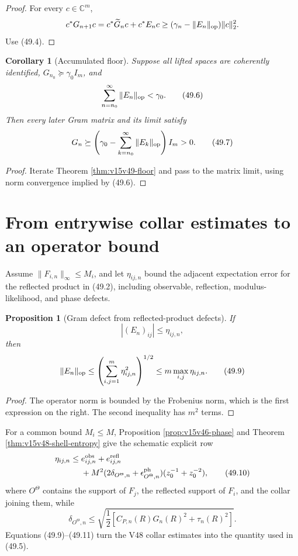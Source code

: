 \documentclass[11pt]{article}
\newtheorem{proposition}[theorem]{Proposition}
\newtheorem{corollary}[theorem]{Corollary}
\theoremstyle{remark}
\begin{document}
\begin{proof}
For every \(c\in\mathbb C^m\),
\[
 c^*G_{n+1}c
 =c^*\widetilde G_nc+c^*E_nc
 \geq(\gamma_n-\|E_n\|_{\rm op})\|c\|_2^2.
\]
Use (49.4).
\end{proof}

\begin{corollary}[Accumulated floor]
\label{cor:v15v49-accumulated}
Suppose all lifted spaces are coherently identified,
\(G_{n_0}\succeq\gamma_0I_m\), and
\[
 \sum_{n=n_0}^\infty\|E_n\|_{\rm op}<\gamma_0.           \tag{49.6}
\]
Then every later Gram matrix and its limit satisfy
\[
 G_n\succeq
 \left(\gamma_0-\sum_{k=n_0}^\infty\|E_k\|_{\rm op}\right)I_m
 >0.                                                     \tag{49.7}
\]
\end{corollary}

\begin{proof}
Iterate Theorem \ref{thm:v15v49-floor} and pass to the matrix
limit, using norm convergence implied by (49.6).
\end{proof}

\section{From entrywise collar estimates to an operator bound}

Assume \(\|F_{i,n}\|_\infty\leq M_i\), and let
\(\eta_{ij,n}\) bound the adjacent expectation error for the
reflected product in (49.2), including observable, reflection,
modulus-likelihood, and phase defects.

\begin{proposition}[Gram defect from reflected-product defects]
\label{prop:v15v49-entry}
If
\[
 |(E_n)_{ij}|\leq\eta_{ij,n},                            \tag{49.8}
\]
then
\[
 \|E_n\|_{\rm op}
 \leq\left(\sum_{i,j=1}^m\eta_{ij,n}^2\right)^{1/2}
 \leq m\max_{i,j}\eta_{ij,n}.                           \tag{49.9}
\]
\end{proposition}

\begin{proof}
The operator norm is bounded by the Frobenius norm, which is the
first expression on the right.  The second inequality has \(m^2\)
terms.
\end{proof}

For a common bound \(M_i\leq M\), Proposition
\ref{prop:v15v46-phase} and Theorem
\ref{thm:v15v48-shell-entropy} give the schematic explicit row
\[
 \begin{split}
 \eta_{ij,n}\leq{}&
 e_{ij,n}^{\rm obs}+e_{ij,n}^{\rm refl}\\
 &+M^2(2\delta_{O^\Theta,n}+\epsilon_{O^\Theta,n}^{\rm ph})
 (z_0^{-1}+z_0^{-2}),                                   \tag{49.10}
 \end{split}
\]
where \(O^\Theta\) contains the support of \(F_j\), the reflected
support of \(F_i\), and the collar joining them, while
\[
 \delta_{O^\Theta,n}\leq
 \sqrt{\frac12\left[
 C_{P,n}(R)G_n(R)^2+\tau_n(R)^2\right]}.                \tag{49.11}
\]
Equations (49.9)--(49.11) turn the V48 collar estimates into the
quantity used in (49.5).
\end{document}
